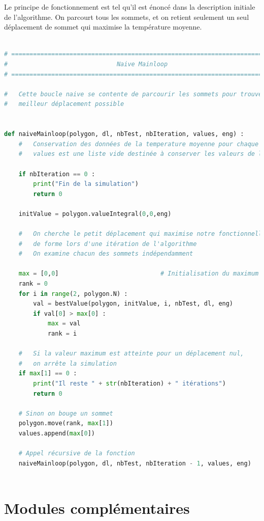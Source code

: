 \documentclass[a4paper,reqno]{article}
\begin{document}
Le principe de fonctionnement est tel qu'il est énoncé dans la description initiale de l'algorithme. On parcourt tous les sommets, et on retient seulement un seul déplacement de sommet qui maximise la température moyenne.
\begin{lstlisting}[language=Python,frame=single,caption=Boucle Principale]

# ============================================================================
#                              Naive Mainloop
# ============================================================================

#   Cette boucle naive se contente de parcourir les sommets pour trouver le
#   meilleur déplacement possible


def naiveMainloop(polygon, dl, nbTest, nbIteration, values, eng) :
    #   Conservation des données de la temperature moyenne pour chaque itération
    #   values est une liste vide destinée à conserver les valeurs de l'intégrale

    if nbIteration == 0 :
        print("Fin de la simulation")
        return 0

    initValue = polygon.valueIntegral(0,0,eng)

    #   On cherche le petit déplacement qui maximise notre fonctionnelle
    #   de forme lors d'une itération de l'algorithme
    #   On examine chacun des sommets indépendamment

    max = [0,0]                            # Initialisation du maximum
    rank = 0
    for i in range(2, polygon.N) :
        val = bestValue(polygon, initValue, i, nbTest, dl, eng)
        if val[0] > max[0] :
            max = val
            rank = i

    #   Si la valeur maximum est atteinte pour un déplacement nul,
    #   on arrête la simulation
    if max[1] == 0 :
        print("Il reste " + str(nbIteration) + " itérations")
        return 0

    # Sinon on bouge un sommet
    polygon.move(rank, max[1])
    values.append(max[0])

    # Appel récursive de la fonction
    naiveMainloop(polygon, dl, nbTest, nbIteration - 1, values, eng)
    
\end{lstlisting}

\newpage
\section*{Modules complémentaires}
\end{document}
